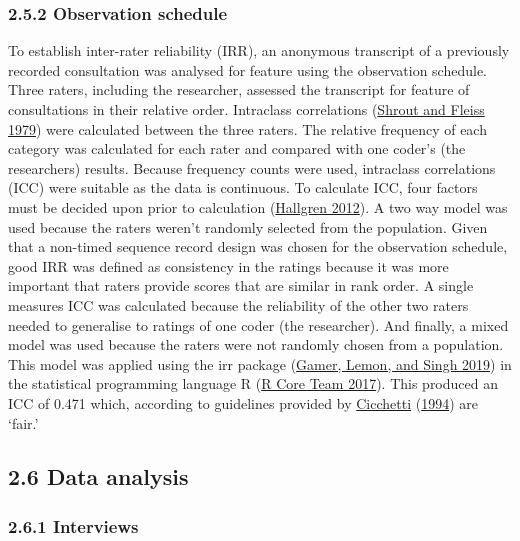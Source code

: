 \documentclass[
]{article}
\begin{document}
\hypertarget{observation-schedule}{%
\subsubsection{2.5.2 Observation schedule}\label{observation-schedule}}

To establish inter-rater reliability (IRR), an anonymous transcript of a
previously recorded consultation was analysed for feature using the
observation schedule. Three raters, including the researcher, assessed
the transcript for feature of consultations in their relative order.
Intraclass correlations
(\protect\hyperlink{ref-shroutIntraclassCorrelationsUses1979}{Shrout and
Fleiss 1979}) were calculated between the three raters. The relative
frequency of each category was calculated for each rater and compared
with one coder's (the researchers) results. Because frequency counts
were used, intraclass correlations (ICC) were suitable as the data is
continuous. To calculate ICC, four factors must be decided upon prior to
calculation
(\protect\hyperlink{ref-hallgrenComputingInterRaterReliability2012}{Hallgren
2012}). A two way model was used because the raters weren't randomly
selected from the population. Given that a non-timed sequence record
design was chosen for the observation schedule, good IRR was defined as
consistency in the ratings because it was more important that raters
provide scores that are similar in rank order. A single measures ICC was
calculated because the reliability of the other two raters needed to
generalise to ratings of one coder (the researcher). And finally, a
mixed model was used because the raters were not randomly chosen from a
population. This model was applied using the irr package
(\protect\hyperlink{ref-gamerIrrVariousCoefficients2019}{Gamer, Lemon,
and Singh 2019}) in the statistical programming language R
(\protect\hyperlink{ref-rcoreteamLanguageEnvironmentStatistical2017}{R
Core Team 2017}). This produced an ICC of 0.471 which, according to
guidelines provided by
\protect\hyperlink{ref-cicchettiGuidelinesCriteriaRules1994}{Cicchetti}
(\protect\hyperlink{ref-cicchettiGuidelinesCriteriaRules1994}{1994}) are
`fair.'

\hypertarget{data-analysis}{%
\subsection{2.6 Data analysis}\label{data-analysis}}

\hypertarget{interviews-2}{%
\subsubsection{2.6.1 Interviews}\label{interviews-2}}
\end{document}
